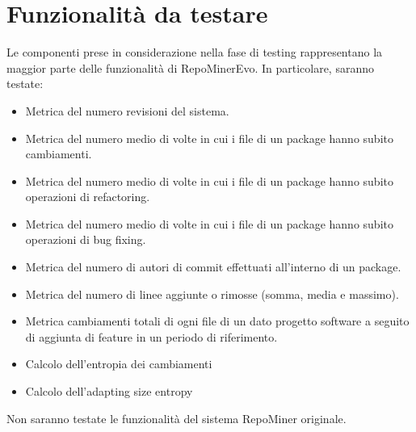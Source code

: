 \chapter{Funzionalità da testare}
Le componenti prese in considerazione nella fase di testing  rappresentano la maggior parte delle funzionalità di RepoMinerEvo. In particolare, saranno testate:\\

\begin{itemize}
\item Metrica del numero revisioni del sistema.
\item Metrica del numero medio di volte in cui i file di un package hanno subito cambiamenti.
\item Metrica del numero medio di volte in cui i file di un package hanno subito operazioni di refactoring.
\item Metrica del numero medio di volte in cui i file di un package hanno subito operazioni di bug fixing.
\item Metrica del numero di autori di commit effettuati all'interno di un package.
\item Metrica del numero di linee aggiunte o rimosse (somma, media e massimo).
\item Metrica cambiamenti totali di ogni file di un dato progetto software a seguito di aggiunta di feature in un periodo di riferimento.
\item Calcolo dell'entropia dei cambiamenti
\item Calcolo dell'adapting size entropy
\end{itemize}
\vspace{0.5cm}
Non saranno testate le funzionalità del sistema RepoMiner originale.\\